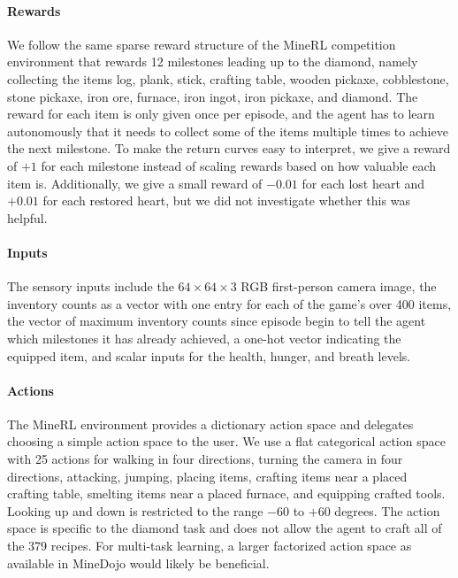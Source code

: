 \paragraph{Rewards}
We follow the same sparse reward structure of the MineRL competition environment that rewards 12 milestones leading up to the diamond, namely collecting the items log, plank, stick, crafting table, wooden pickaxe, cobblestone, stone pickaxe, iron ore, furnace, iron ingot, iron pickaxe, and diamond.
The reward for each item is only given once per episode, and the agent has to learn autonomously that it needs to collect some of the items multiple times to achieve the next milestone. 
To make the return curves easy to interpret, we give a reward of $+1$ for each milestone instead of scaling rewards based on how valuable each item is.
Additionally, we give a small reward of $-0.01$ for each lost heart and $+0.01$ for each restored heart, but we did not investigate whether this was helpful.

\paragraph{Inputs}
The sensory inputs include the $64\times64\times3$ RGB first-person camera image, the inventory counts as a vector with one entry for each of the game's over 400 items, the vector of maximum inventory counts since episode begin to tell the agent which milestones it has already achieved, a one-hot vector indicating the equipped item, and scalar inputs for the health, hunger, and breath levels.

\paragraph{Actions}
The MineRL environment provides a dictionary action space and delegates choosing a simple action space to the user. We use a flat categorical action space with 25 actions for walking in four directions, turning the camera in four directions, attacking, jumping, placing items, crafting items near a placed crafting table, smelting items near a placed furnace, and equipping crafted tools. Looking up and down is restricted to the range $-60$ to $+60$ degrees. The action space is specific to the diamond task and does not allow the agent to craft all of the 379 recipes. For multi-task learning, a larger factorized action space as available in MineDojo \citep{fan2022minedojo} would likely be beneficial.

